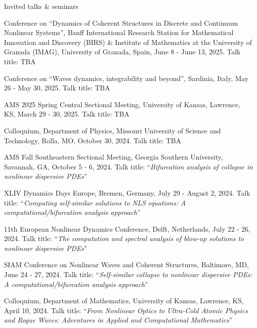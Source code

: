 \documentclass[10pt]{article} %
\begin{document}
\begin{section}{Invited talks \& seminars}
\begin{etaremune}
\setlength\itemsep{1em}

\item
\vskip  -6.5mm

Conference on ``Dynamics of Coherent Structures in Discrete and Continuum Nonlinear Systems'', Banff International
Research Station for Mathematical Innovation and Discovery (BIRS) \& Institute of Mathematics at the
University of Granada (IMAG), University of Granada, Spain, June 8 - June 13, 2025. Talk title: TBA

\item Conference on ``Waves dynamics, integrability and beyond'', Sardinia, Italy, May 26 - May 30, 2025.
Talk title: TBA

\item AMS 2025 Spring Central Sectional Meeting, University of Kansas, Lawrence, KS, March 29 - 30, 2025.
Talk title: TBA

\item Colloquium, Department of Physics, Missouri University of Science and Technology, Rolla, MO, October 30, 2024.
Talk title: TBA

\item AMS Fall Southeastern Sectional Meeting, Georgia Southern University, Savannah, GA, October 5 - 6, 2024.
Talk title: ``\textit{Bifurcation analysis of collapse in nonlinear dispersive PDEs}''

\item XLIV Dynamics Days Europe, Bremen, Germany, July 29 - August 2, 2024.
Talk title: ``\textit{Computing self-similar solutions to NLS equations: A computational/bifurcation analysis approach}''

\item 11th European Nonlinear Dynamics Conference, Delft, Netherlands, July 22 - 26, 2024.
Talk title: ``\textit{The computation and spectral analysis of blow-up solutions to nonlinear dispersive PDEs}''

\item SIAM Conference on Nonlinear Waves and Coherent Structures, Baltimore, MD, June 24 - 27, 2024.
Talk title: ``\textit{Self-similar collapse to nonlinear dispersive PDEs: A computational/bifurcation analysis approach}''

\item Colloquium, Department of Mathematics, University of Kansas, Lawrence, KS, April 10, 2024.
Talk title: ``\textit{From Nonlinear Optics to Ultra-Cold Atomic Physics and Rogue Waves:
Adventures in Applied and Computational Mathematics}''


\end{etaremune}
\end{section}
\end{document}
